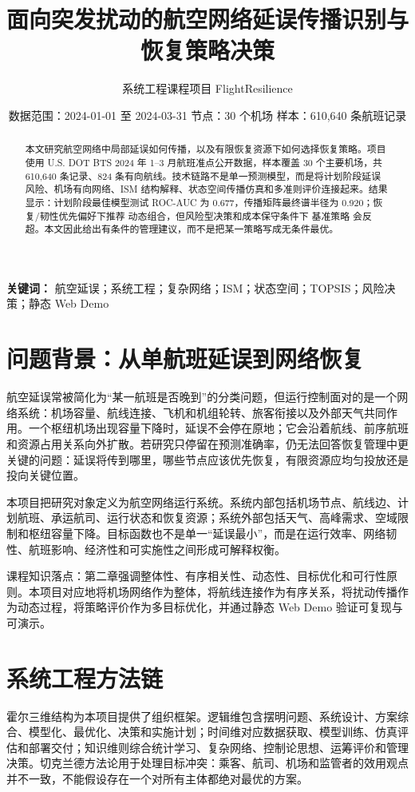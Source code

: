 \documentclass[UTF8,zihao=-4]{ctexart}
\title{\bfseries\textcolor{flightnavy}{面向突发扰动的航空网络延误传播识别与恢复策略决策}}
\author{系统工程课程项目 \quad FlightResilience}
\date{数据范围：2024-01-01 至 2024-03-31 \quad 节点：30 个机场 \quad 样本：610,640 条航班记录}
\newcommand{\keypoint}[1]{\begin{tcolorbox}[colback=flightpaper,colframe=flightline,boxrule=0.5pt,arc=1.5mm,left=2mm,right=2mm,top=1mm,bottom=1mm]\small #1\end{tcolorbox}}
\begin{document}
\maketitle
\begin{abstract}
本文研究航空网络中局部延误如何传播，以及有限恢复资源下如何选择恢复策略。项目使用 U.S. DOT BTS 2024 年 1--3 月航班准点公开数据，样本覆盖 30 个主要机场，共 610,640 条记录、824 条有向航线。技术链路不是单一预测模型，而是将计划阶段延误风险、机场有向网络、ISM 结构解释、状态空间传播仿真和多准则评价连接起来。结果显示：计划阶段最佳模型测试 ROC-AUC 为 0.677，传播矩阵最终谱半径为 0.920；恢复/韧性优先偏好下推荐 动态组合，但风险型决策和成本保守条件下 基准策略 会反超。本文因此给出有条件的管理建议，而不是把某一策略写成无条件最优。
\end{abstract}
\noindent\textbf{关键词：} 航空延误；系统工程；复杂网络；ISM；状态空间；TOPSIS；风险决策；静态 Web Demo

\section{问题背景：从单航班延误到网络恢复}
航空延误常被简化为“某一航班是否晚到”的分类问题，但运行控制面对的是一个网络系统：机场容量、航线连接、飞机和机组轮转、旅客衔接以及外部天气共同作用。一个枢纽机场出现容量下降时，延误不会停在原地；它会沿着航线、前序航班和资源占用关系向外扩散。若研究只停留在预测准确率，仍无法回答恢复管理中更关键的问题：延误将传到哪里，哪些节点应该优先恢复，有限资源应均匀投放还是投向关键位置。

本项目把研究对象定义为航空网络运行系统。系统内部包括机场节点、航线边、计划航班、承运航司、运行状态和恢复资源；系统外部包括天气、高峰需求、空域限制和枢纽容量下降。目标函数也不是单一“延误最小”，而是在运行效率、网络韧性、航班影响、经济性和可实施性之间形成可解释权衡。

\keypoint{课程知识落点：第二章强调整体性、有序相关性、动态性、目标优化和可行性原则。本项目对应地将机场网络作为整体，将航线连接作为有序关系，将扰动传播作为动态过程，将策略评价作为多目标优化，并通过静态 Web Demo 验证可复现与可演示。}

\section{系统工程方法链}
霍尔三维结构为本项目提供了组织框架。逻辑维包含摆明问题、系统设计、方案综合、模型化、最优化、决策和实施计划；时间维对应数据获取、模型训练、仿真评估和部署交付；知识维则综合统计学习、复杂网络、控制论思想、运筹评价和管理决策。切克兰德方法论用于处理目标冲突：乘客、航司、机场和监管者的效用观点并不一致，不能假设存在一个对所有主体都绝对最优的方案。
\end{document}
